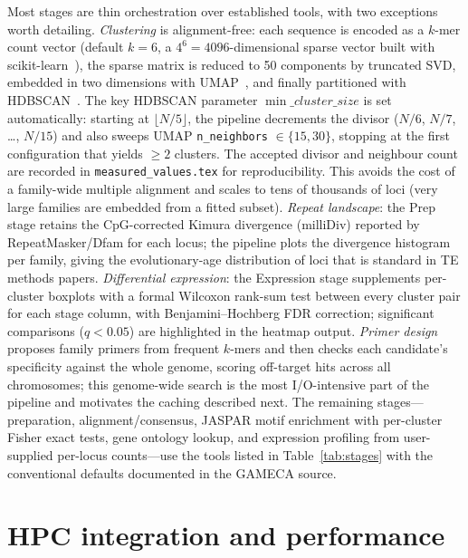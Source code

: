 \documentclass[11pt]{article}
\begin{document}
Most stages are thin orchestration over established tools, with two exceptions worth
detailing. \emph{Clustering} is alignment-free: each sequence is encoded as a $k$-mer count
vector (default $k{=}6$, a $4^6{=}4096$-dimensional sparse vector built with
scikit-learn~\citep{pedregosa2011}), the sparse matrix is reduced to 50 components by
truncated SVD, embedded in two dimensions with UMAP~\citep{mcinnes2018umap}, and finally
partitioned with HDBSCAN~\citep{mcinnes2017hdbscan}. The key HDBSCAN parameter
$\min\_cluster\_size$ is set automatically: starting at $\lfloor N/5 \rfloor$, the pipeline
decrements the divisor ($N/6$, $N/7$, \ldots, $N/15$) and also sweeps UMAP
\texttt{n\_neighbors} $\in \{15, 30\}$, stopping at the first configuration that yields
${\geq}2$ clusters. The accepted divisor and neighbour count are recorded in
\texttt{measured\_values.tex} for reproducibility. This avoids the cost of a family-wide
multiple alignment and scales to tens of thousands of loci (very large families are embedded
from a fitted subset). \emph{Repeat landscape}: the Prep stage retains the CpG-corrected
Kimura divergence (milliDiv) reported by RepeatMasker/Dfam for each locus; the pipeline
plots the divergence histogram per family, giving the evolutionary-age distribution of loci
that is standard in TE methods papers. \emph{Differential expression}: the Expression stage
supplements per-cluster boxplots with a formal Wilcoxon rank-sum test between every cluster
pair for each stage column, with Benjamini--Hochberg FDR correction; significant
comparisons ($q{<}0.05$) are highlighted in the heatmap output.
\emph{Primer design} proposes family primers from frequent $k$-mers
and then checks each candidate's specificity against the whole genome, scoring off-target
hits across all chromosomes; this genome-wide search is the most I/O-intensive part of the
pipeline and motivates the caching described next. The remaining stages---preparation,
alignment/consensus, JASPAR motif enrichment with per-cluster Fisher exact tests, gene
ontology lookup, and expression profiling from user-supplied per-locus counts---use the tools
listed in Table~\ref{tab:stages} with the conventional defaults documented in the GAMECA
source.

\section{HPC integration and performance}
\label{sec:hpc}
\end{document}
